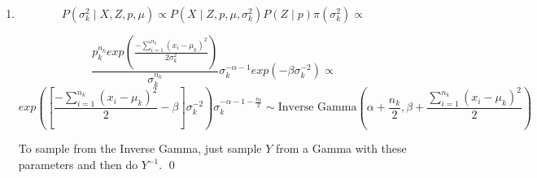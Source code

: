 \documentclass[12pt,letterpaper]{article}
\begin{document}
\begin{enumerate}[leftmargin=!,labelindent=5pt]
$$
P(\mu_k \mid X, Z, p, \sigma^2) \propto
exp \left(
	\frac{-\sum_{i=1}^{n_k}(x_i^{(k)} - \mu_k)^2}{2\sigma_k^2} -
	\frac{(\mu_k - m)^2}{2\tau^2}
\right)
$$
First, note that $x_i^{(k)}$ is the $i$-th value from $X$ such
that $z = k$, in other words, it is the $i$-th sampled value that came
from the $k$-th Gaussian distribution.

Note that the above equation is the same as updating each
Normal
prior distribution $\mu_k \sim N(m, \tau^2)$ and
$X^{(k)} \mid \mu_k \sim N(\mu_k, \sigma^2_k)$ with $\sigma^2_k$ known.
Therefore, let $\bar{x_k}$ be the sample average, then:
$$\mu_j \mid X, Z, p,\sigma^2
\sim N\left(
\frac{n_k \sigma_k ^{-2}\bar{x_k} + \tau^{-2}m}
{\tau^{-2} + n_k\sigma^{-2}_k}
, [n_k\sigma_k^{-2} + \tau^{-2}]^{-1}
\right)$$
\qed

\item 

$$
P(\sigma_k ^2 \mid X, Z, p, \mu) \propto
P(X \mid Z, p, \mu, \sigma_k^2) P(Z \mid p) \pi(\sigma_k^2)
\propto
$$

$$
\frac{p_k^{n_k} exp\left(
	\frac{-\sum_{i=1}^{n_k}(x_i - \mu_k)^2}{2\sigma^2_k}
\right)}
{\sigma_k^{n_k}}
\sigma_k^{-\alpha -1}exp(-\beta \sigma_k^{-2}) \propto
$$
$$
exp \left( 
\left [
	\frac{-\sum_{i=1}^{n_k}(x_i - \mu_k)^2}{2}
	- \beta
\right] \sigma_k^{-2}
\right)
\sigma_k^{-\alpha -1 - \frac{n_k}{2}} \sim
\text{Inverse Gamma}\left(
\alpha + \frac{n_k}{2}, \beta +
\frac{\sum_{i=1}^{n_k}(x_i - \mu_k)^2}{2}
\right)
$$

To sample from the Inverse Gamma, just sample $Y$ from a Gamma with these
parameters and then do $Y^{-1}$.
\qed


\end{enumerate}
\end{document}
